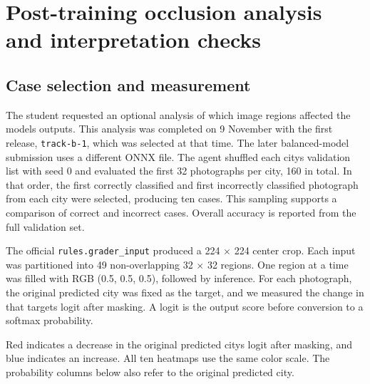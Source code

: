 \documentclass[11pt]{article}
\begin{document}
\section{Post-training occlusion analysis and interpretation checks}

\subsection{Case selection and measurement}

The student requested an optional analysis of which image regions affected
the model\textquotesingle{}s outputs. This analysis was completed on 9 November with
the first release, \texttt{track-b-1}, which was selected at that time.
The later balanced-model submission uses a different ONNX file.
The agent shuffled each city\textquotesingle{}s validation list with seed
0 and evaluated the first 32 photographs per city, 160 in total. In that
order, the first correctly classified and first incorrectly classified
photograph from each city were selected, producing ten cases. This sampling
supports a comparison of correct and incorrect cases. Overall accuracy is
reported from the full validation set.

The official \texttt{rules.grader\_input} produced a 224 $\times$ 224 center
crop. Each input was partitioned into 49 non-overlapping 32 $\times$ 32
regions. One region at a time was filled with RGB (0.5, 0.5, 0.5), followed
by inference. For each photograph, the original predicted city was fixed as
the target, and we measured the change in that target\textquotesingle{}s logit after masking.
A logit is the output score before conversion to a softmax probability.

Red indicates a decrease in the original predicted city\textquotesingle{}s logit after
masking, and blue indicates an increase. All ten heatmaps use the same color
scale. The probability columns below also refer to the original predicted
city.
\end{document}
